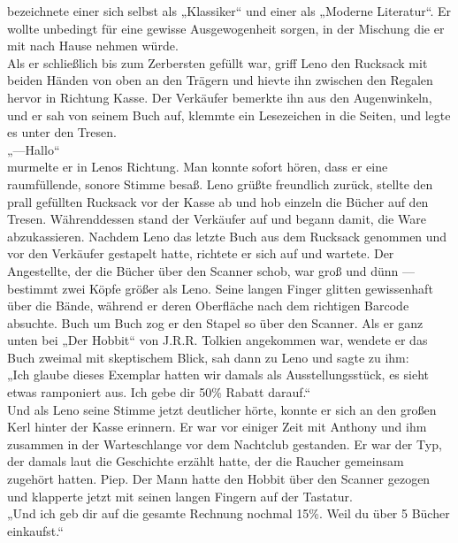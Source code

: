 \documentclass[ngerman,smalldemyvopaper,11pt,oneside,onecolumn,openright,extrafontsizes]{memoir}
\begin{document}
bezeichnete einer sich selbst als „Klassiker“ und einer als „Moderne Literatur“. Er wollte unbedingt für eine gewisse Ausgewogenheit sorgen, in der Mischung die er mit nach Hause nehmen würde.
\vspace{0.5em} \\
Als er schließlich bis zum Zerbersten gefüllt war, griff Leno den Rucksack mit beiden Händen von oben an den Trägern und hievte ihn zwischen den Regalen hervor in Richtung Kasse. Der Verkäufer bemerkte ihn aus den Augenwinkeln, und er sah von seinem Buch auf, klemmte ein Lesezeichen in die Seiten, und legte es unter den Tresen.
\vspace{0.5em} \\
„—Hallo“
\vspace{0.5em} \\
murmelte er in Lenos Richtung. Man konnte sofort hören, dass er eine raumfüllende, sonore Stimme besaß. Leno grüßte freundlich zurück, stellte den prall gefüllten Rucksack vor der Kasse ab und hob einzeln die Bücher auf den Tresen. Währenddessen stand der Verkäufer auf und begann damit, die Ware abzukassieren. Nachdem Leno das letzte Buch aus dem Rucksack genommen und vor den Verkäufer gestapelt hatte, richtete er sich auf und wartete. Der Angestellte, der die Bücher über den Scanner schob, war groß und dünn — bestimmt zwei Köpfe größer als Leno. Seine langen Finger glitten gewissenhaft über die Bände, während er deren Oberfläche nach dem richtigen Barcode absuchte. Buch um Buch zog er den Stapel so über den Scanner. Als er ganz unten bei „Der Hobbit“ von J.R.R. Tolkien angekommen war, wendete er das Buch zweimal mit skeptischem Blick, sah dann zu Leno und sagte zu ihm:
\vspace{0.5em} \\
„Ich glaube dieses Exemplar hatten wir damals als Ausstellungsstück, es sieht etwas ramponiert aus. Ich gebe dir 50\% Rabatt darauf.“
\vspace{0.5em} \\
Und als Leno seine Stimme jetzt deutlicher hörte, konnte er sich an den großen Kerl hinter der Kasse erinnern. Er war vor einiger Zeit mit Anthony und ihm zusammen in der Warteschlange vor dem Nachtclub gestanden. Er war der Typ, der damals laut die Geschichte erzählt hatte, der die Raucher gemeinsam zugehört hatten. Piep. Der Mann hatte den Hobbit über den Scanner gezogen und klapperte jetzt mit seinen langen Fingern auf der Tastatur.
\vspace{0.5em} \\
„Und ich geb dir auf die gesamte Rechnung nochmal 15\%. Weil du über 5 Bücher einkaufst.“
\end{document}
